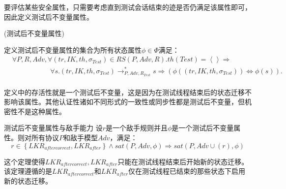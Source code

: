 要评估某些安全属性，只需要考虑直到测试会话结束的迹是否仍满足该属性即可，因此定义测试后不变量属性。
\begin{definition}{(测试后不变量属性)}


定义测试后不变量属性的集合为所有状态属性$\phi \in \Phi $满足：
	  \[\begin{aligned}
  & \forall P,R,Adv,\forall \left( tr,IK,th,{{\sigma }_{Test}} \right)\in RS\left( P,Adv,R \right).th\left( Test \right)=\left\langle _{{}} \right\rangle \Rightarrow  \\
 & \ \ \ \ \ \ \ \ \ \ \ \ \ \ \ \ \ \ \ \ \ \ \ \ \ \forall s.\left( tr,IK,th,{{\sigma }_{Test}} \right)\to _{P,Adv,{{R}_{Test}}}^{*}s\Rightarrow \left( \phi \left( \left( tr,IK,th,{{\sigma }_{Test}} \right) \right)\Leftrightarrow \phi \left( s \right) \right). \\
\end{aligned}\]
\end{definition}
定义中的存活性就是一个测试后不变量，这是因为在测试线程结束后的状态迁移不影响该属性。其他认证性诸如不同形式的一致性或同步性都是测试后不变量，但机密性不是这种属性。
\begin{theorm}{测试后不变量属性与敌手能力}
 设$r$是一个敌手规则并且$\phi$是一个测试后不变量属性。则对所有协议$P$和敌手模型$Adv$，满足：
	 \[r\in \left\{ LK{{R}_{aftercorrect}},LK{{R}_{after}} \right\}\wedge sat\left( P,Adv,\phi  \right)\Rightarrow sat\left( P,Adv\cup \left( r \right),\phi  \right)\]
\end{theorm}
	这个定理使得$LK{{R}_{aftercorrect}},LK{{R}_{after}}$只能在测试线程结束后开始新的状态迁移。该定理遵循的是$LKR_{aftercorrect}$和$LKR_{after}$仅在测试线程已结束的那些状态下启用新的状态迁移。 





